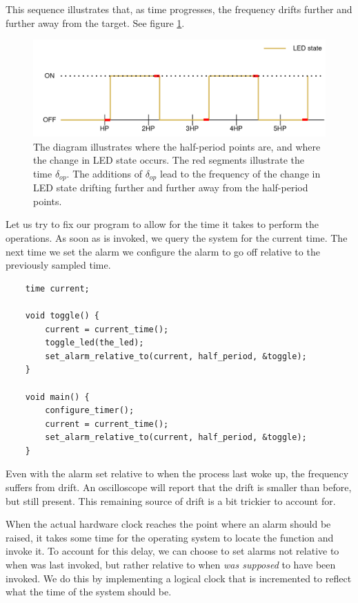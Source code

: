 This sequence illustrates that, as time progresses, the frequency drifts further and further away from the target. See
figure \ref{graphics:drift}.

\begin{figure}
    \centering
    \includegraphics[scale=0.2]{graphics/drift.png}
    \caption{The diagram illustrates where the half-period points are, and where the change in LED state occurs.
    The red segments illustrate the time $\delta_{op}$. The additions of $\delta_{op}$ lead to the frequency of the change in
    LED state drifting further and further away from the half-period points.}
    \label{graphics:drift}
\end{figure}

Let us try to fix our program to allow for the time it takes to perform the operations.
As soon as  is invoked, we query the system for the current time. The next time we set
the alarm we configure the alarm to go off relative to the previously sampled time.

\begin{verbatim}
    time current;

    void toggle() {
        current = current_time();
        toggle_led(the_led);
        set_alarm_relative_to(current, half_period, &toggle);
    }

    void main() {
        configure_timer();
        current = current_time();
        set_alarm_relative_to(current, half_period, &toggle);
    }
\end{verbatim}

Even with the alarm set relative to when the process last woke up, the frequency suffers from drift. An oscilloscope
will report that the drift is smaller than before, but still present. This remaining source of drift is a bit
trickier to account for.

When the actual hardware clock reaches the point where an alarm should be raised, it takes some time for the
operating system to locate the  function and invoke it. To account for this delay, we can choose to
set alarms not relative to when  was last invoked, but rather relative to when 
\textit{was supposed} to have been invoked. We do this by implementing a logical clock that is incremented to reflect
what the time of the system should be.

